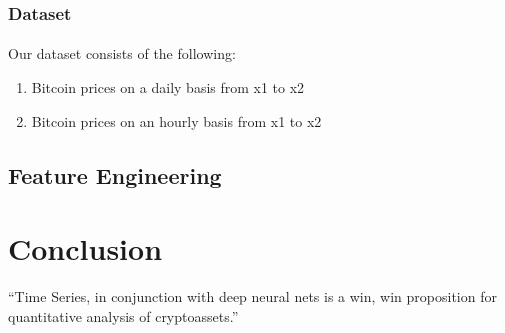 \documentclass{article}
\begin{document}
\subsubsection{Dataset}
\paragraph{}
Our dataset consists of the following:
\begin{enumerate}
    \item Bitcoin prices on a daily basis from x1 to x2
    \item Bitcoin prices on an hourly basis from x1 to x2
\end{enumerate}


\subsection{Feature Engineering}


\section{Conclusion}
``Time Series, in conjunction with deep neural nets is a win, win proposition for quantitative analysis of cryptoassets.'' \citep{adams1995hitchhiker}



\end{document}
